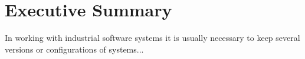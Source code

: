 \section*{Executive Summary}


In working with industrial software systems it is usually necessary to keep several versions or configurations of 
systems...

\clearpage
